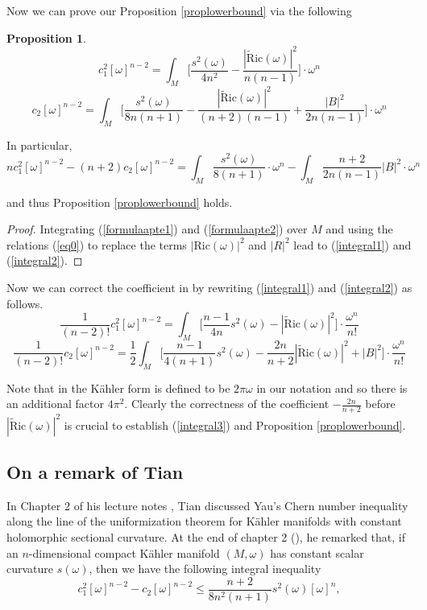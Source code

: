 \documentclass[11pt]{amsart}
\theoremstyle{definition}
\newtheorem{proposition}[theorem]{Proposition}
\theoremstyle{remark}
\numberwithin{equation}{section}
\begin{document}
Now we can prove our Proposition \ref{proplowerbound} via the
following

\begin{proposition}
\begin{equation}\label{integral1} c_1^2[\omega]^{n-2}=
\int_M\big[\frac{s^2(\omega)}{4n^2}-\frac{
|\tilde{\text{R}}\text{ic}(\omega)|^2}{n(n-1)}\big]\cdot\omega^n \end{equation}
 \begin{equation}\label{integral2}
 c_2[\omega]^{n-2}=\int_M\big[\frac{s^2(\omega)}{8n(n+1)}-\frac{
|\tilde{\text{R}}\text{ic}(\omega)|^2}{(n+2)(n-1)}+\frac{|B|^2}{2n(n-1)}\big]\cdot\omega^n
 \end{equation}

 In particular,
 \begin{equation}\label{integral3}
nc_1^2[\omega]^{n-2}-(n+2)c_2[\omega]^{n-2}
=\int_M\frac{s^2(\omega)}{8(n+1)}\cdot\omega^n-
\int_M\frac{n+2}{2n(n-1)}|B|^2\cdot\omega^n\end{equation}

and thus Proposition \ref{proplowerbound} holds.
\end{proposition}

\begin{proof}
Integrating (\ref{formulaapte1}) and (\ref{formulaapte2}) over $M$
and using the relations (\ref{eq0}) to replace the terms
$|\text{Ric}(\omega)|^2$ and $|R|^2$ lead to (\ref{integral1}) and
(\ref{integral2}).
\end{proof}

Now we can correct the coefficient in \cite[(2.80a)]{Be} by
rewriting (\ref{integral1}) and (\ref{integral2}) as follows.
$$\frac{1}{(n-2)!}c_1^2[\omega]^{n-2}=
\int_M\big[\frac{n-1}{4n}s^2(\omega)-|\tilde{\text{R}}\text{ic}(\omega)|^2\big]\cdot\frac{\omega^n}{n!}$$
$$\frac{1}{(n-2)!}c_2[\omega]^{n-2}=\frac{1}{2}\int_M\big[\frac{n-1}{4(n+1)}s^2(\omega)
-\frac{2n}{n+2}|\tilde{\text{R}}\text{ic}(\omega)|^2+
|B|^2\big]\cdot\frac{\omega^n}{n!}$$

Note that in \cite[p. 80]{Be} the K\"{a}hler form is defined to be
$2\pi\omega$ in our notation and so there is an additional factor
$4\pi^2$. Clearly the correctness of the coefficient
$-\frac{2n}{n+2}$ before $|\tilde{\text{R}}\text{ic}(\omega)|^2$ is
crucial to establish (\ref{integral3}) and Proposition
\ref{proplowerbound}.

\subsection{On a remark of Tian}\label{section3.2}
In Chapter 2 of his lecture notes \cite{Ti}, Tian discussed Yau's
Chern number inequality along the line of the uniformization theorem
for K\"{a}hler manifolds with constant holomorphic sectional
curvature. At the end of chapter 2 (\cite[Remark 2.15]{Ti}), he
remarked that, if an $n$-dimensional compact K\"{a}hler manifold
$(M,\omega)$ has constant scalar curvature $s(\omega)$, then  we
have the following integral inequality
\begin{equation}\label{Tian}c_1^2[\omega]^{n-2}-c_2[\omega]^{n-2}\leq\frac{n+2}{8n^2(n+1)}s^2(\omega)[\omega]^n,\end{equation}
\end{document}
